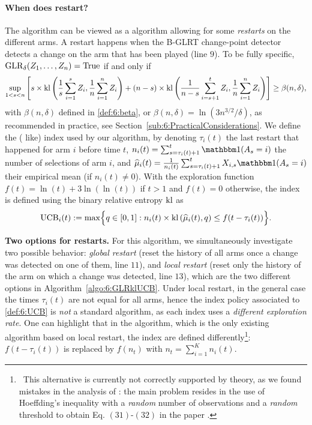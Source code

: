 \paragraph{When does \GLRklUCB{} restart?}

The \GLRklUCB{} algorithm can be viewed as a \klUCB{} algorithm allowing for some \emph{restarts} on the different arms. A restart happens when the B-GLRT change-point detector detects a change on the arm that has been played (line $9$).
%
To be fully specific, $\mathrm{GLR}_\delta(Z_1,\dots,Z_n) = \mathrm{True}$ if and only if
\begin{equation}\label{eq:whenDoesGLRklUCBrestart}
    \sup_{1 < s < n} \left[s \times \mathrm{kl} \left(\frac{1}{s}\sum_{i=1}^s Z_i , \frac{1}{n}\sum_{i=1}^n Z_i\right) + (n-s) \times \mathrm{kl} \left(\frac{1}{n-s}\sum_{i=s+1}^t Z_i , \frac{1}{n}\sum_{i=1}^n Z_i\right)\right] \geq \beta(n,\delta),
\end{equation}
%
with $\beta(n,\delta)$ defined in \eqref{def:6:beta}, or $\beta(n,\delta) = \ln(3n^{3/2}/\delta)$, as recommended in practice, see Section~\ref{sub:6:PracticalConsiderations}. We define the (\klUCB{} like) index used by our algorithm, by denoting
$\tau_i(t)$ the last restart that happened for arm $i$ before time $t$,
$n_i(t) = \sum_{s=\tau_i(t)+1}^{t} \indic(A_s=i)$
the number of selections of arm $i$, and
$\widehat{\mu}_i(t) = \frac{1}{n_i(t)} \sum_{s=\tau_i(t)+1}^{t}X_{i,s} \indic(A_s=i)$
their empirical mean (if $n_i(t)\neq0$).
%
With the exploration function $f(t) = \ln(t) + 3 \ln(\ln(t))$ if $t>1$ and $f(t)=0$ otherwise,
the index is defined using the binary relative entropy $\mathrm{kl}$ as
%
\begin{equation}\label{def:6:UCB}
    \mathrm{UCB}_i(t) := \max \Bigl\{ q\in[0,1] : n_i(t) \times \mathrm{kl}\left(\widehat{\mu}_i(t),q\right) \leq f(t - \tau_i(t)) \Bigr\}.
\end{equation}


\textbf{Two options for restarts.}
%
For this algorithm, we simultaneously investigate two possible behavior: \emph{global restart} (reset the history of all arms once a change was detected on one of them, line $11$), and \emph{local restart} (reset only the history of the arm on which a change was detected, line $13$), which are the two different options in Algorithm~\ref{algo:6:GLRklUCB}.
%
Under local restart, in the general case the times $\tau_i(t)$ are not equal for all arms, hence the index policy associated to \eqref{def:6:UCB} is \emph{not} a standard \UCB{} algorithm, as each index uses a \emph{different exploration rate}.
%
One can highlight that in the \CUSUMUCB{} algorithm, which is the only existing algorithm based on local restart, the \UCB{} index are defined differently\footnote{~This alternative is currently not correctly supported by theory, as we found mistakes in the analysis of \CUSUMUCB: the main problem resides in the use of Hoeffding's inequality with a \emph{random} number of observations and a \emph{random} threshold to obtain Eq. $(31)$-$(32)$ in the paper \cite{LiuLeeShroff17}.}:
$f(t-\tau_i(t))$ is replaced by $f(n_t)$ with $n_t = \sum_{i=1}^K n_i(t)$.


